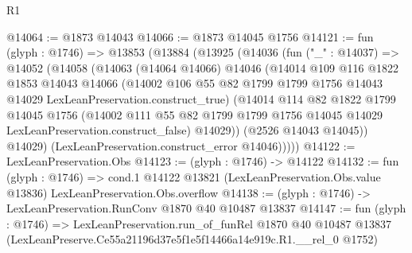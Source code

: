 \begin{lexlean}{R1}
\begin{coremodule}
@14064 := @1873 @14043
@14066 := @1873 @14045 @1756
@14121 := fun (glyph : @1746) =>
  @13853
    (@13884
      (@13925
        (@14036
          (fun ("_" : @14037) =>
          @14052
            (@14058
              (@14063
                (@14064 @14066)
                @14046
                (@14014
                  @109
                  @116
                  @1822
                  @1853
                  @14043
                  @14066
                  (@14002
                    @106
                    @55
                    @82
                    @1799
                    @1799
                    @1756
                    @14043
                    @14029
                    LexLeanPreservation.construct_true)
                  (@14014
                    @114
                    @82
                    @1822
                    @1799
                    @14045
                    @1756
                    (@14002
                      @111
                      @55
                      @82
                      @1799
                      @1799
                      @1756
                      @14045
                      @14029
                      LexLeanPreservation.construct_false)
                    @14029))
                (@2526 @14043 @14045))
              @14029)
            (LexLeanPreservation.construct_error @14046)))))
@14122 := LexLeanPreservation.Obs
@14123 := (glyph : @1746) -> @14122
@14132 := fun (glyph : @1746) =>
  cond.{1} @14122 @13821 (LexLeanPreservation.Obs.value @13836) LexLeanPreservation.Obs.overflow
@14138 := (glyph : @1746) -> LexLeanPreservation.RunConv @1870 @40 @10487 @13837
@14147 := fun (glyph : @1746) =>
  LexLeanPreservation.run_of_funRel
    @1870
    @40
    @10487
    @13837
    (LexLeanPreserve.Ce55a21196d37e5f1e5f14466a14e919c.R1.__rel_0 @1752)
\end{coremodule}
\end{lexlean}

